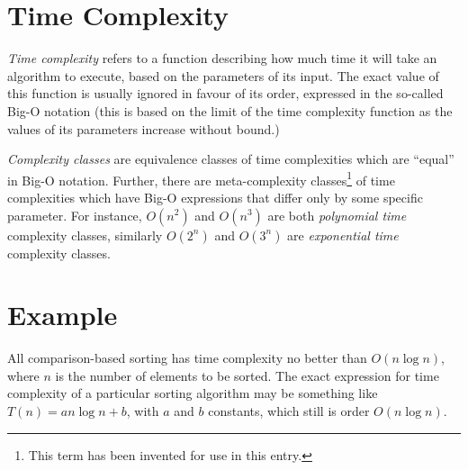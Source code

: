 \documentclass[12pt]{article}
\begin{document}
\section{Time Complexity} 

\emph{Time complexity} refers to a function describing how much time it will take an algorithm to execute, based on the parameters of its input.  The exact value of this function is usually ignored in favour of its order, expressed in the so-called Big-O notation (this is based on the limit of the time complexity function as the values of its parameters increase without bound.)

\emph{Complexity classes} are equivalence classes of time complexities which are ``equal'' in Big-O notation.  Further, there are meta-complexity classes\footnote{This term has been invented for use in this entry.} of time complexities which have Big-O expressions that differ only by some specific parameter.  For instance, $O(n^2)$ and $O(n^3)$ are both \emph{polynomial time} complexity classes, similarly $O(2^n)$ and $O(3^n)$ are \emph{exponential time} complexity classes.

\section{Example}

All comparison-based sorting has time complexity no better than $O(n \log n)$, where $n$ is the number of elements to be sorted. The exact expression for time complexity of a particular sorting algorithm may be something like $T(n)= a n \log  n + b$, with $a$ and $b$ constants, which still is order $O(n \log n)$.
\end{document}
